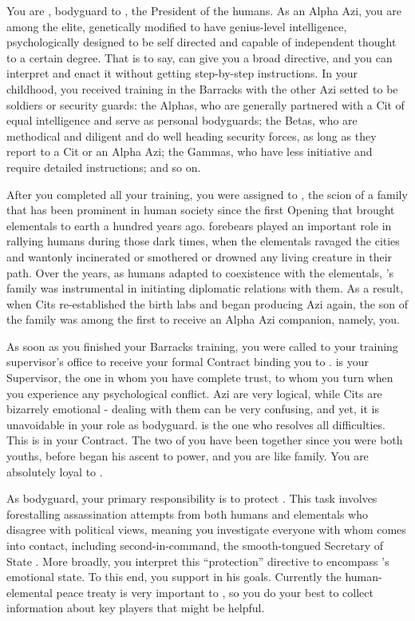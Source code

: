 \documentclass[char]{elementals}
\begin{document}
\name{\cRomeo{}}

You are \cRomeo{\intro}, bodyguard to \cLeader{\intro}, the President of the humans.  As an Alpha Azi, you are among the elite, genetically modified to have genius-level intelligence, psychologically designed to be self directed and capable of independent thought to a certain degree.  That is to say, \cLeader{} can give you a broad directive, and you can interpret and enact it without getting step-by-step instructions.  In your childhood, you received training in the Barracks with the other Azi setted to be soldiers or security guards: the Alphas, who are generally partnered with a Cit of equal intelligence and serve as personal bodyguards; the Betas, who are methodical and diligent and do well heading security forces, as long as they report to a Cit or an Alpha Azi; the Gammas, who have less initiative and require detailed instructions; and so on.

After you completed all your training, you were assigned to \cLeader{}, the scion of a family that has been prominent in human society since the first Opening that brought elementals to earth a hundred years ago.  \cLeader{\Their} forebears played an important role in rallying humans during those dark times, when the elementals ravaged the cities and wantonly incinerated or smothered or drowned any living creature in their path.  Over the years, as humans adapted to coexistence with the elementals, \cLeader{}'s family was instrumental in initiating diplomatic relations with them.  As a result, when Cits re-established the birth labs and began producing Azi again, the son of the \cLeader{\last} family was among the first to receive an Alpha Azi companion, namely, you.

As soon as you finished your Barracks training, you were called to your training supervisor's office to receive your formal Contract binding you to \cLeader{}.  \cLeader{\They} is your Supervisor, the one in whom you have complete trust, to whom you turn when you experience any psychological conflict.  Azi are very logical, while Cits are bizarrely emotional - dealing with them can be very confusing, and yet, it is unavoidable in your role as bodyguard.  \cLeader{} is the one who resolves all difficulties.  This is in your Contract.  The two of you have been together since you were both youths, before \cLeader{\they} began his ascent to power, and you are like family.  You are absolutely loyal to \cLeader{\them}.

As \cLeader{\their} bodyguard, your primary responsibility is to protect \cLeader{\them}.  This task involves forestalling assassination attempts from both humans and elementals who disagree with \cLeader{\their} political views, meaning you investigate everyone with whom \cLeader{\they} comes into contact, including \cLeader{\their} second-in-command, the smooth-tongued Secretary of State \cDema{\intro}.  More broadly, you interpret this ``protection'' directive to encompass \cLeader{}'s emotional state.  To this end, you support \cLeader{\them} in his goals.  Currently the human-elemental peace treaty is very important to \cLeader{\them}, so you do your best to collect information about key players that might be helpful.
\end{document}
